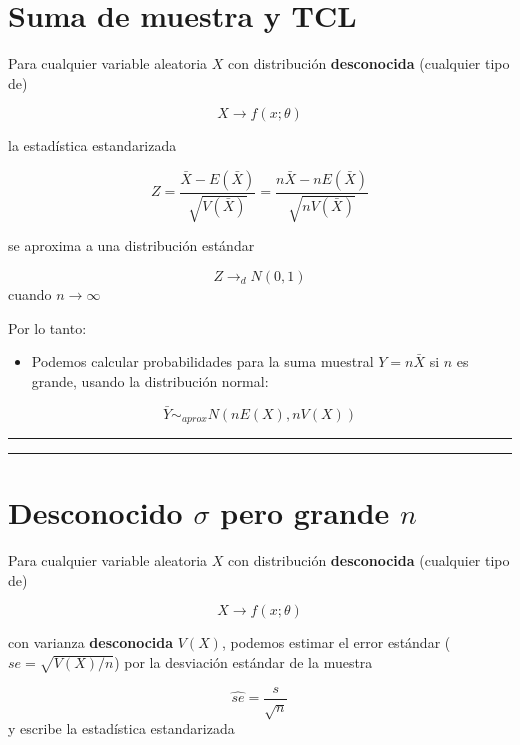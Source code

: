 \documentclass[
]{book}
\providecommand{\tightlist}{%
  \setlength{\itemsep}{0pt}\setlength{\parskip}{0pt}}
\begin{document}
\hypertarget{suma-de-muestra-y-tcl}{%
\section{Suma de muestra y TCL}\label{suma-de-muestra-y-tcl}}

Para cualquier variable aleatoria \(X\) con distribución \textbf{desconocida} (cualquier tipo de)

\[X \rightarrow f(x; \theta)\]

la estadística estandarizada

\[Z=\frac{\bar{X}-E(\bar{X})}{\sqrt{V(\bar{X})}}=\frac{n\bar{X}-nE(\bar{X})}{\sqrt{nV(\bar{X})}}\]

se aproxima a una distribución estándar

\[Z \rightarrow_d N(0,1)\] cuando \(n\rightarrow \infty\)

Por lo tanto:

\begin{itemize}
\tightlist
\item
  Podemos calcular probabilidades para la suma muestral \(Y=n\bar{X}\) si \(n\) es grande, usando la distribución normal:
\end{itemize}

\[\bar{Y} \sim_{aprox} N(nE(X), nV(X))\]

\begin{center}\rule{0.5\linewidth}{0.5pt}\end{center}

\begin{center}\rule{0.5\linewidth}{0.5pt}\end{center}

\hypertarget{desconocido-sigma-pero-grande-n}{%
\section{\texorpdfstring{Desconocido \(\sigma\) pero grande \(n\)}{Desconocido \textbackslash sigma pero grande n}}\label{desconocido-sigma-pero-grande-n}}

Para cualquier variable aleatoria \(X\) con distribución \textbf{desconocida} (cualquier tipo de)

\[X \rightarrow f(x; \theta)\]

con varianza \textbf{desconocida} \(V(X)\), podemos estimar el error estándar (\(se=\sqrt{V(X)/n}\)) por la desviación estándar de la muestra

\[\hat{se}=\frac{s}{\sqrt{n}}\] y escribe la estadística estandarizada
\end{document}
